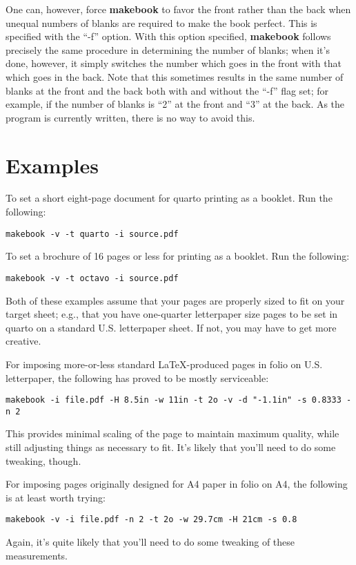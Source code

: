\documentclass[12pt,twoside,final]{extarticle}
\begin{document}
One can, however, force \textbf{makebook} to favor the front rather than the back when unequal numbers of blanks are required  to  make the book perfect. This is specified with the ``-f'' option. With this option specified, \textbf{makebook} follows precisely the same procedure in determining the number of blanks; when it's done, however, it  simply switches the number which goes in the front with that which goes in the back. Note that this sometimes results in the same number of blanks at the front and the back both with and without the  ``-f'' flag set; for example, if the number of blanks is ``2'' at the front and ``3'' at the back. As the program is currently written, there is no way to avoid this.
\section{Examples}
To set a short eight-page document for quarto printing as a booklet. Run the following:

{\scriptsize
\begin{verbatim}
makebook -v -t quarto -i source.pdf
\end{verbatim}
}
%
To set a brochure of 16 pages or less for printing as a booklet. Run the following:

{\scriptsize
\begin{verbatim}
makebook -v -t octavo -i source.pdf
\end{verbatim}
}
%
Both of these examples assume that your pages are properly sized to fit on your target sheet; e.g., that you have one-quarter letterpaper size pages to be set in quarto on a standard U.S. letterpaper sheet. If not, you may have to get more creative.

For imposing more-or-less standard LaTeX-produced pages in folio on U.S. letterpaper, the following has proved to be mostly serviceable:

{\scriptsize
\begin{verbatim}
makebook -i file.pdf -H 8.5in -w 11in -t 2o -v -d "-1.1in" -s 0.8333 -n 2
\end{verbatim}
}
%
This provides minimal scaling of the page to maintain maximum quality, while still adjusting things as necessary to fit.  It's likely that you'll need to do some tweaking, though.

For imposing pages originally designed for A4 paper in folio on A4, the following is at least worth trying:

{\scriptsize
\begin{verbatim}
makebook -v -i file.pdf -n 2 -t 2o -w 29.7cm -H 21cm -s 0.8
\end{verbatim}
}
%
Again, it's quite likely that you'll need to do some tweaking of these measurements.
\end{document}

